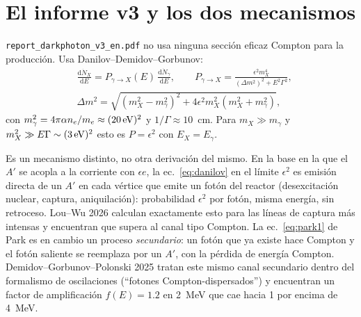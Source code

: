 \documentclass[11pt,a4paper]{article}
\newcommand{\Ap}{A'}
\newcommand{\eps}{\epsilon}
\newcommand{\dd}{\mathrm{d}}
\begin{document}
\section{El informe v3 y los dos mecanismos}
\label{sec:two}
\texttt{report\_darkphoton\_v3\_en.pdf} no usa ninguna sección eficaz Compton para la producción. Usa
Danilov--Demidov--Gorbunov:
\begin{equation}
\begin{aligned}
&\frac{\dd\dot N_X}{\dd E}=P_{\gamma\to X}(E)\,\frac{\dd\dot N_\gamma}{\dd E},\qquad
P_{\gamma\to X}=\frac{\eps^2m_X^4}{(\Delta m^2)^2+E^2\Gamma^2},\\
&\Delta m^2=\sqrt{(m_X^2-m_\gamma^2)^2+4\eps^2m_X^2(m_X^2+m_\gamma^2)},
\end{aligned}
\label{eq:danilov}
\end{equation}
con $m_\gamma^2=4\pi\alpha n_e/m_e\approx(20\,{\rm eV})^2$ y $1/\Gamma\approx10$~cm. Para $m_X\gg m_\gamma$ y
$m_X^2\gg E\Gamma\sim(3\,{\rm eV})^2$ esto es $P=\eps^2$ con $E_X=E_\gamma$.

Es un mecanismo distinto, no otra derivación del mismo. En la base en la que el $\Ap$ se acopla a la corriente con
$\eps e$, la ec.~\eqref{eq:danilov} en el límite $\eps^2$ es emisión directa de un $\Ap$ en cada vértice que emite un
fotón del reactor (desexcitación nuclear, captura, aniquilación): probabilidad $\eps^2$ por fotón, misma energía, sin
retroceso. Lou--Wu 2026 calculan exactamente esto para las líneas de captura más intensas y encuentran que supera al
canal tipo Compton. La ec.~\eqref{eq:park1} de Park es en cambio un proceso \emph{secundario}: un fotón que ya existe
hace Compton y el fotón saliente se reemplaza por un $\Ap$, con la pérdida de energía Compton. Demidov--Gorbunov--Polonski
2025 tratan este mismo canal secundario dentro del formalismo de oscilaciones (``fotones Compton-dispersados'') y
encuentran un factor de amplificación $f(E)=1.2$ en 2~MeV que cae hacia 1 por encima de 4~MeV.
\end{document}
